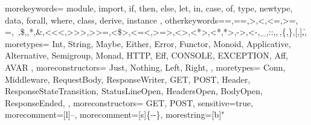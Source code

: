 {
  morekeywords={
    module,
    import,
    if,
    then,
    else,
    let,
    in,
    case,
    of,
    type,
    newtype,
    data,
    forall,
    where,
    class,
    derive,
    instance
  },
  otherkeywords={=,==,>,<,<=,>=,\\=,~,\$,\@,*,\&,<<<,>>>,>>=,<\$>,<=<,>=>,<>,<*>,<*,*>,->,<-,_,::,\(,\),\{,\},[,],\|},
  moretypes={
    Int,
    String,
    Maybe,
    Either,
    Error,
    Functor,
    Monoid,
    Applicative,
    Alternative,
    Semigroup,
    Monad,
    HTTP,
    Eff,
    CONSOLE,
    EXCEPTION,
    Aff,
    AVAR
  },
  moreconstructors={
    Just,
    Nothing,
    Left,
    Right,
  },
  moretypes={
    Conn,
    Middleware,
    RequestBody,
    ResponseWriter,
    GET,
    POST,
    Header,
    ResponseStateTransition,
    StatusLineOpen,
    HeadersOpen,
    BodyOpen,
    ResponseEnded,
  },
  moreconstructors={
    GET,
    POST,
  }
  sensitive=true,
  morecomment=[l]{--}, %
  morecomment=[s]{\{-}{-\}}, %
  morestring=[b]" %
}
